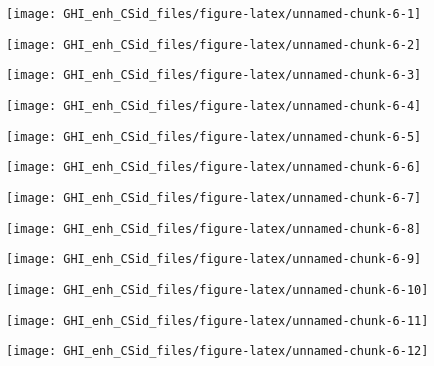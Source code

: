 \documentclass[
  10pt,
  a4paper,oneside]{article}
\begin{document}
\begin{center}\texttt{[image: GHI\_enh\_CSid\_files/figure-latex/unnamed-chunk-6-1]} \end{center}

\begin{center}\texttt{[image: GHI\_enh\_CSid\_files/figure-latex/unnamed-chunk-6-2]} \end{center}

\begin{center}\texttt{[image: GHI\_enh\_CSid\_files/figure-latex/unnamed-chunk-6-3]} \end{center}

\begin{center}\texttt{[image: GHI\_enh\_CSid\_files/figure-latex/unnamed-chunk-6-4]} \end{center}

\begin{center}\texttt{[image: GHI\_enh\_CSid\_files/figure-latex/unnamed-chunk-6-5]} \end{center}

\begin{center}\texttt{[image: GHI\_enh\_CSid\_files/figure-latex/unnamed-chunk-6-6]} \end{center}

\begin{center}\texttt{[image: GHI\_enh\_CSid\_files/figure-latex/unnamed-chunk-6-7]} \end{center}

\begin{center}\texttt{[image: GHI\_enh\_CSid\_files/figure-latex/unnamed-chunk-6-8]} \end{center}

\begin{center}\texttt{[image: GHI\_enh\_CSid\_files/figure-latex/unnamed-chunk-6-9]} \end{center}

\begin{center}\texttt{[image: GHI\_enh\_CSid\_files/figure-latex/unnamed-chunk-6-10]} \end{center}

\begin{center}\texttt{[image: GHI\_enh\_CSid\_files/figure-latex/unnamed-chunk-6-11]} \end{center}

\begin{center}\texttt{[image: GHI\_enh\_CSid\_files/figure-latex/unnamed-chunk-6-12]} \end{center}
\end{document}

